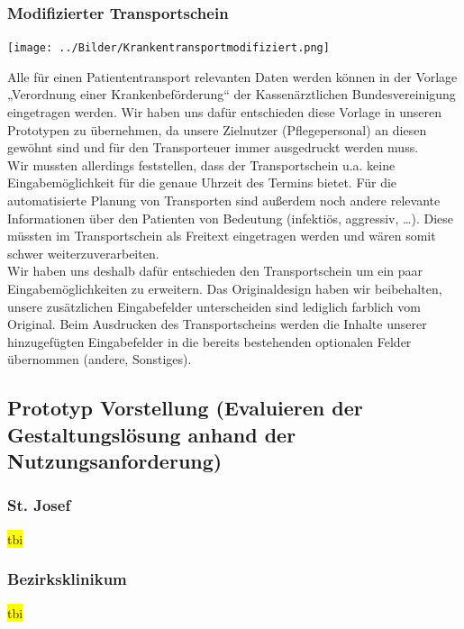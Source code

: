 \documentclass[a4paper, ngerman, 12pt]{scrartcl}
\begin{document}
\subsubsection{Modifizierter Transportschein}
\begin{center}
\begin{minipage}{0.8\textwidth}
	\centering
	\texttt{[image: ../Bilder/Krankentransportmodifiziert.png]}
	\label{img:Krankentransportmodifiziert}
\end{minipage}
\end{center}
Alle für einen Patiententransport relevanten Daten werden können in der Vorlage „Verordnung einer Krankenbeförderung“ der Kassenärztlichen Bundesvereinigung eingetragen werden. Wir haben uns dafür entschieden diese Vorlage in unseren Prototypen zu übernehmen, da unsere Zielnutzer (Pflegepersonal) an diesen gewöhnt sind und für den Transporteuer immer ausgedruckt werden muss.\\

Wir mussten allerdings feststellen, dass der Transportschein u.a. keine Eingabemöglichkeit für die genaue Uhrzeit des Termins bietet. Für die automatisierte Planung von Transporten sind außerdem noch andere relevante Informationen über den Patienten von Bedeutung (infektiös, aggressiv, …). Diese müssten im Transportschein als Freitext eingetragen werden und wären somit schwer weiterzuverarbeiten.\\

Wir haben uns deshalb dafür entschieden den Transportschein um ein paar Eingabemöglichkeiten zu erweitern. Das Originaldesign haben wir beibehalten, unsere zusätzlichen Eingabefelder unterscheiden sind lediglich farblich vom Original. Beim Ausdrucken des Transportscheins werden die Inhalte unserer hinzugefügten Eingabefelder in die bereits bestehenden optionalen Felder übernommen (andere, Sonstiges).
\subsection{Prototyp Vorstellung (Evaluieren der Gestaltungslösung anhand der Nutzungsanforderung) }
\subsubsection{St. Josef}
\colorbox{yellow}{tbi}\\
\subsubsection{Bezirksklinikum}
\colorbox{yellow}{tbi}\\
\end{document}
